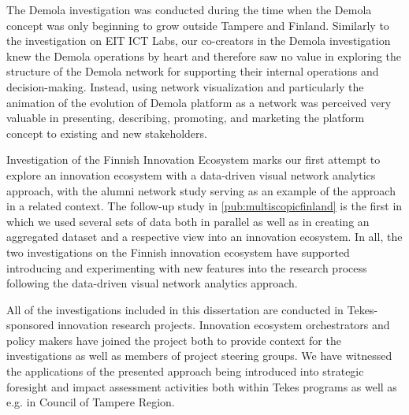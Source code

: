 The Demola investigation was conducted during the time when the Demola concept was only beginning to grow outside Tampere and Finland. Similarly to the investigation on EIT ICT Labs, our co-creators in the Demola investigation knew the Demola operations by heart and therefore saw no value in exploring the structure of the Demola network for supporting their internal operations and decision-making. Instead, using network visualization and particularly the animation of the evolution of Demola platform as a network was perceived very valuable in presenting, describing, promoting, and marketing the platform concept to existing and new stakeholders. 

Investigation of the Finnish Innovation Ecosystem \citep{Huhtamaki2010AFinancing} marks our first attempt to explore an innovation ecosystem with a data-driven visual network analytics approach, with the alumni network study \citep{Rubens2011AlumniAnalysis} serving as an example of the approach in a related context. The follow-up study in \ref{pub:multiscopicfinland} is the first in which we used several sets of data both in parallel as well as in creating an aggregated dataset and a respective view into an innovation ecosystem. In all, the two investigations on the Finnish innovation ecosystem have supported introducing and experimenting with new features into the research process following the data-driven visual network analytics approach.

All of the investigations included in this dissertation are conducted in Tekes-sponsored innovation research projects. Innovation ecosystem orchestrators and policy makers have joined the project both to provide context for the investigations as well as members of project steering groups. We have witnessed the applications of the presented approach being introduced into strategic foresight and impact assessment activities both within Tekes programs as well as e.g. in Council of Tampere Region.